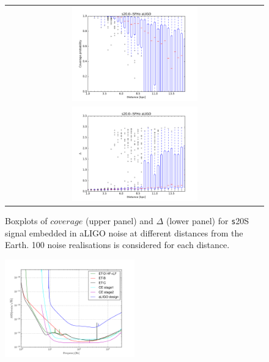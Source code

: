 \begin{figure}
  \centering
  \begin{tabular}{c}
    \includegraphics[width=0.5\textwidth]{plots/s20--SFHo_covpbb_boxplot_aLIGO} \\
    \includegraphics[width=0.5\textwidth]{plots/s20--SFHo_error_boxplot_aLIGO} \\
  \end{tabular}
    
 \caption{Boxplots of $coverage$ (upper panel) and $\Delta$ (lower panel) for {\texttt s20S} signal embedded in aLIGO noise at different distances from the Earth. 100 noise realisations is considered for each distance.
 }
  \label{fig:s20results}
\end{figure}


\begin{figure}
 \centering
 \includegraphics[width=0.5\textwidth]{plots/spectrum}
 \caption{} \label{fig:spectrum}
\end{figure}

